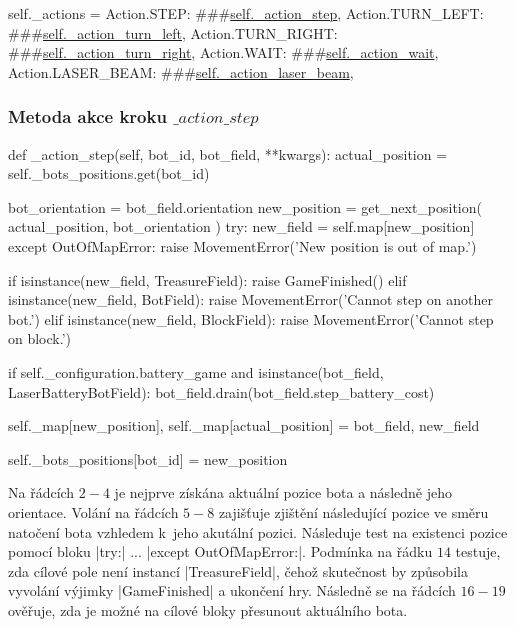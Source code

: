 \begin{code}[caption={Slovník akcí ve třídě $Game$},label={lst:game-actions},aboveskip=-10pt]
self._actions = {
    Action.STEP: ###\hyperref[subsubsec:method-action-step]{self.\_action\_step},
    Action.TURN_LEFT: ###\hyperref[subsubsec:method-action-turn-left]{self.\_action\_turn\_left},
    Action.TURN_RIGHT: ###\hyperref[subsubsec:method-action-turn-right]{self.\_action\_turn\_right},
    Action.WAIT: ###\hyperref[subsubsec:method-action-wait]{self.\_action\_wait},
    Action.LASER_BEAM: ###\hyperref[subsubsec:method-action-laser-beam]{self.\_action\_laser\_beam},
}	
\end{code}
{ %


\subsubsection{Metoda akce kroku $\_action\_step$}
\label{subsubsec:method-action-step}
\begin{code}[caption={Metoda $Game.\_action\_step$},label={lst:game-action-step}]
def _action_step(self, bot_id, bot_field, **kwargs):
    actual_position = self._bots_positions.get(bot_id)

    bot_orientation = bot_field.orientation
    new_position = get_next_position(
        actual_position,
        bot_orientation
    )
    try:
        new_field = self.map[new_position]
    except OutOfMapError:
        raise MovementError('New position is out of map.')

    if isinstance(new_field, TreasureField):
        raise GameFinished()
    elif isinstance(new_field, BotField):
        raise MovementError('Cannot step on another bot.')
    elif isinstance(new_field, BlockField):
        raise MovementError('Cannot step on block.')

    if self._configuration.battery_game and isinstance(bot_field, LaserBatteryBotField):
        bot_field.drain(bot_field.step_battery_cost)

    self._map[new_position], self._map[actual_position] = bot_field, new_field

    self._bots_positions[bot_id] = new_position
\end{code}

Na řádcích $2-4$ je nejprve získána aktuální pozice bota a následně jeho orientace. Volání na řádcích $5-8$ zajišťuje zjištění následující pozice ve směru natočení bota vzhledem k~jeho akutální pozici. Následuje test na existenci pozice pomocí bloku \ic|try:| $...$ \ic|except OutOfMapError:|. Podmínka na řádku $14$ testuje, zda cílové pole není instancí \ic|TreasureField|, čehož skutečnost by způsobila vyvolání výjimky \ic|GameFinished| a ukončení hry. Následně se na řádcích $16-19$ ověřuje, zda je možné na cílové bloky přesunout aktuálního bota.

}
